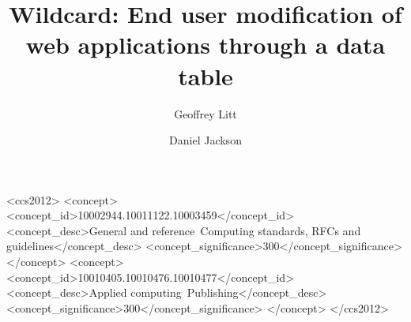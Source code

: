 \documentclass[english,submission]{programming}
\begin{document}
\title{Wildcard: End user modification of web applications through a
data table}
\subtitle{}%

\author{Geoffrey Litt}
\author{Daniel Jackson}





\begin{CCSXML}
<ccs2012>
<concept>
<concept_id>10002944.10011122.10003459</concept_id>
<concept_desc>General and reference~Computing standards, RFCs and guidelines</concept_desc>
<concept_significance>300</concept_significance>
</concept>
<concept>
<concept_id>10010405.10010476.10010477</concept_id>
<concept_desc>Applied computing~Publishing</concept_desc>
<concept_significance>300</concept_significance>
</concept>
</ccs2012>
\end{CCSXML}



\maketitle
\end{document}
